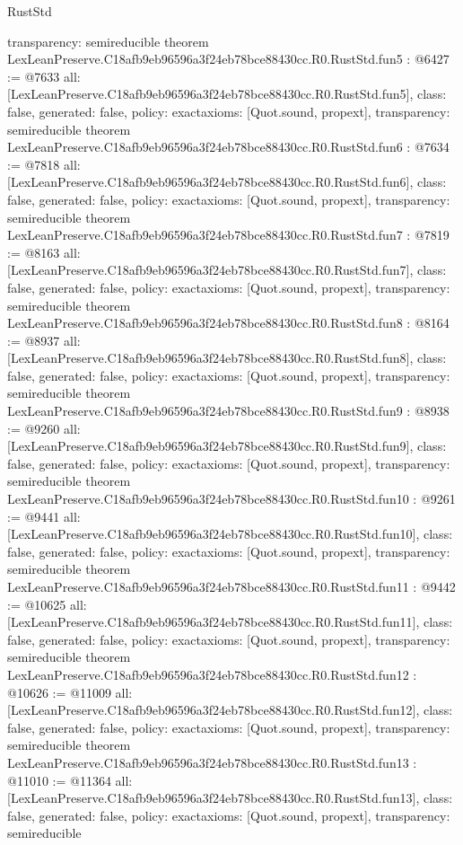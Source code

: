 \begin{lexlean}{RustStd}
\begin{coremodule}
{  transparency: semireducible
}
theorem LexLeanPreserve.C18afb9eb96596a3f24eb78bce88430cc.R0.RustStd.fun5 : @6427 := @7633 {
  all: [LexLeanPreserve.C18afb9eb96596a3f24eb78bce88430cc.R0.RustStd.fun5],
  class: false,
  generated: false,
  policy: exact{axioms: [Quot.sound, propext]},
  transparency: semireducible
}
theorem LexLeanPreserve.C18afb9eb96596a3f24eb78bce88430cc.R0.RustStd.fun6 : @7634 := @7818 {
  all: [LexLeanPreserve.C18afb9eb96596a3f24eb78bce88430cc.R0.RustStd.fun6],
  class: false,
  generated: false,
  policy: exact{axioms: [Quot.sound, propext]},
  transparency: semireducible
}
theorem LexLeanPreserve.C18afb9eb96596a3f24eb78bce88430cc.R0.RustStd.fun7 : @7819 := @8163 {
  all: [LexLeanPreserve.C18afb9eb96596a3f24eb78bce88430cc.R0.RustStd.fun7],
  class: false,
  generated: false,
  policy: exact{axioms: [Quot.sound, propext]},
  transparency: semireducible
}
theorem LexLeanPreserve.C18afb9eb96596a3f24eb78bce88430cc.R0.RustStd.fun8 : @8164 := @8937 {
  all: [LexLeanPreserve.C18afb9eb96596a3f24eb78bce88430cc.R0.RustStd.fun8],
  class: false,
  generated: false,
  policy: exact{axioms: [Quot.sound, propext]},
  transparency: semireducible
}
theorem LexLeanPreserve.C18afb9eb96596a3f24eb78bce88430cc.R0.RustStd.fun9 : @8938 := @9260 {
  all: [LexLeanPreserve.C18afb9eb96596a3f24eb78bce88430cc.R0.RustStd.fun9],
  class: false,
  generated: false,
  policy: exact{axioms: [Quot.sound, propext]},
  transparency: semireducible
}
theorem LexLeanPreserve.C18afb9eb96596a3f24eb78bce88430cc.R0.RustStd.fun10 : @9261 := @9441 {
  all: [LexLeanPreserve.C18afb9eb96596a3f24eb78bce88430cc.R0.RustStd.fun10],
  class: false,
  generated: false,
  policy: exact{axioms: [Quot.sound, propext]},
  transparency: semireducible
}
theorem LexLeanPreserve.C18afb9eb96596a3f24eb78bce88430cc.R0.RustStd.fun11 : @9442 := @10625 {
  all: [LexLeanPreserve.C18afb9eb96596a3f24eb78bce88430cc.R0.RustStd.fun11],
  class: false,
  generated: false,
  policy: exact{axioms: [Quot.sound, propext]},
  transparency: semireducible
}
theorem LexLeanPreserve.C18afb9eb96596a3f24eb78bce88430cc.R0.RustStd.fun12 : @10626 := @11009 {
  all: [LexLeanPreserve.C18afb9eb96596a3f24eb78bce88430cc.R0.RustStd.fun12],
  class: false,
  generated: false,
  policy: exact{axioms: [Quot.sound, propext]},
  transparency: semireducible
}
theorem LexLeanPreserve.C18afb9eb96596a3f24eb78bce88430cc.R0.RustStd.fun13 : @11010 := @11364 {
  all: [LexLeanPreserve.C18afb9eb96596a3f24eb78bce88430cc.R0.RustStd.fun13],
  class: false,
  generated: false,
  policy: exact{axioms: [Quot.sound, propext]},
  transparency: semireducible
}
\end{coremodule}
\end{lexlean}
